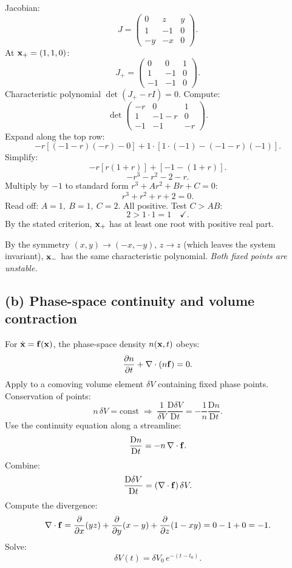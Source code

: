 \documentclass[11pt]{article}
\newcommand{\D}{\mathrm{D}}
\newcommand{\pd}[2]{\frac{\partial #1}{\partial #2}}
\begin{document}
Jacobian:
\[ J = \begin{pmatrix} 0 & z & y \\ 1 & -1 & 0 \\ -y & -x & 0 \end{pmatrix}. \]
At $\vb x_+=(1,1,0)$:
\[ J_+ = \begin{pmatrix} 0 & 0 & 1 \\ 1 & -1 & 0 \\ -1 & -1 & 0 \end{pmatrix}. \]
Characteristic polynomial $\det(J_+-r I)=0$. Compute:
\[ \det\begin{pmatrix} -r & 0 & 1 \\ 1 & -1-r & 0 \\ -1 & -1 & -r \end{pmatrix}. \]
Expand along the top row:
\[ -r[(-1-r)(-r) - 0] + 1\cdot[1\cdot(-1) - (-1-r)(-1)]. \]
Simplify:
\[ -r[r(1+r)] + [-1 - (1+r)]. \]
\[ -r^3 - r^2 - 2 - r. \]
Multiply by $-1$ to standard form $r^3+Ar^2+Br+C=0$:
\[ r^3 + r^2 + r + 2 = 0. \]
Read off: $A=1,\ B=1,\ C=2$. All positive. Test $C>AB$:
\[ 2 > 1\cdot 1 = 1\quad\checkmark. \]
By the stated criterion, $\vb x_+$ has at least one root with positive real part.

By the symmetry $(x,y)\to(-x,-y)$, $z\to z$ (which leaves the system invariant), $\vb x_-$ has the same characteristic polynomial. \emph{Both fixed points are unstable.}

\subsection*{(b) Phase-space continuity and volume contraction}

For $\dot{\vb x}=\vb f(\vb x)$, the phase-space density $n(\vb x,t)$ obeys:
\[ \pd{n}{t} + \nabla\cdot(n\vb f) = 0. \]
Apply to a comoving volume element $\delta V$ containing fixed phase points. Conservation of points:
\[ n\,\delta V = \text{const} \;\Rightarrow\; \frac{1}{\delta V}\frac{\D \delta V}{\D t} = -\frac{1}{n}\frac{\D n}{\D t}. \]
Use the continuity equation along a streamline:
\[ \frac{\D n}{\D t} = -n\,\nabla\cdot\vb f. \]
Combine:
\[ \frac{\D \delta V}{\D t} = (\nabla\cdot\vb f)\,\delta V. \]
Compute the divergence:
\[ \nabla\cdot\vb f = \pd{}{x}(yz) + \pd{}{y}(x-y) + \pd{}{z}(1-xy) = 0 - 1 + 0 = -1. \]
Solve:
\begin{equation}
\boxed{\;\delta V(t) = \delta V_0\,e^{-(t-t_0)}.\;}
\label{eq:volcontract}
\end{equation}
\end{document}
